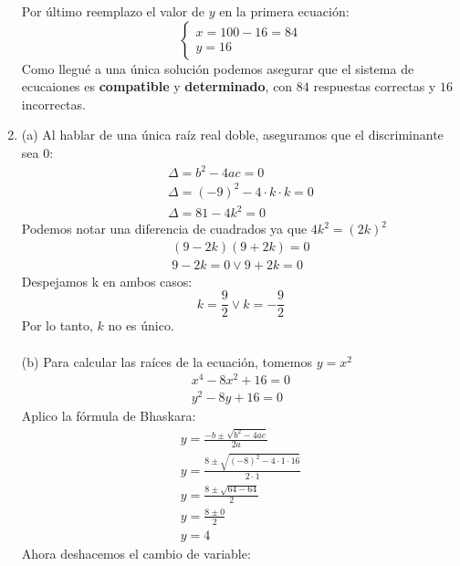 \documentclass[a4paper]{article}
\begin{document}
\begin{enumerate}
        Por último reemplazo el valor de $y$ en la primera ecuación:
        \begin{equation*}
            \left\{
            \begin{array}{l}
                x=100-16=84\\
                y=16
            \end{array}
            \right.
        \end{equation*}
        Como llegué a una única solución podemos asegurar que el sistema de ecucaiones es \textbf{compatible} y \textbf{determinado}, con $84$ respuestas correctas y $16$ incorrectas.
        \item (a) Al hablar de una única raíz real doble, aseguramos que el discriminante sea 0:
        \begin{gather*}
            \Delta=b^2-4ac=0\\
            \Delta=(-9)^2-4\cdot k \cdot k=0\\
            \Delta=81-4k^2=0
        \end{gather*}
        Podemos notar una diferencia de cuadrados ya que $4k^2=(2k)^2$
        \begin{gather*}
            (9-2k)(9+2k)=0\\
            9-2k=0 \vee 9+2k=0
        \end{gather*}
        Despejamos k en ambos casos:
        \begin{equation*}
                k=\frac{9}{2} \vee k=-\frac{9}{2}
        \end{equation*}
        Por lo tanto, $k$ no es único.\\\\
        (b) Para calcular las raíces de la ecuación, tomemos $y=x^2$
        \begin{gather*}
            x^4-8x^2+16=0\\
            y^2-8y+16=0
        \end{gather*}
        Aplico la fórmula de Bhaskara:
        \begin{gather*}
            y=\frac{-b\pm\sqrt{b^2-4ac}}{2a}\\
            y=\frac{8\pm\sqrt{(-8)^2-4\cdot 1 \cdot 16}}{2\cdot 1}\\
            y=\frac{8\pm\sqrt{64-64}}{2}\\
            y=\frac{8\pm 0}{2}\\
            y=4
        \end{gather*}
        Ahora deshacemos el cambio de variable:

\end{enumerate}
\end{document}
